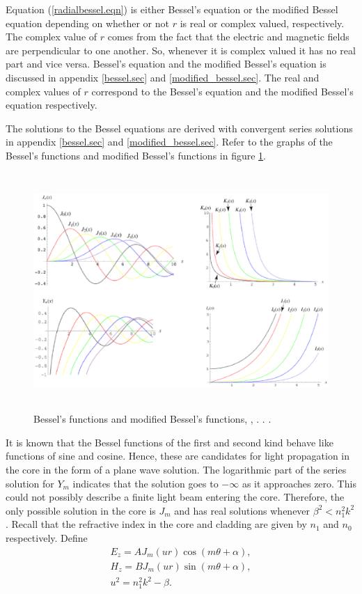 \documentclass[12pt]{article}
\theoremstyle{definition}
\numberwithin{equation}{section}
\begin{document}
{Equation (\ref{radialbessel.eqn}) is either Bessel's equation or the modified Bessel equation depending on whether or not $r$ is real or complex valued, respectively. The complex value of $r$ comes from the fact that the electric and magnetic fields are perpendicular to one another. So, whenever it is complex valued it has no real part and vice versa. Bessel's equation and the modified Bessel's equation is discussed in appendix \ref{bessel.sec} and \ref{modified_bessel.sec}. The real and complex values of $r$ correspond to the Bessel's equation and the modified Bessel's equation respectively.

The solutions to the Bessel equations are derived with convergent series solutions in appendix \ref{bessel.sec} and \ref{modified_bessel.sec}. Refer to the graphs of the Bessel's functions and modified Bessel's functions in figure \ref{figure_bessel}.
\begin{figure}[h!]
\centerline{\includegraphics[height = 90mm, width=160mm, angle=0]{bessel.eps}}
\caption{Bessel's functions and modified Bessel's functions, \cite{wolfJ}, \cite{wolfY}. \cite{wolfK}. \cite{wolfI}.}
\label{figure_bessel}
\end{figure}

It is known that the Bessel functions of the first and second kind behave like functions of sine and cosine. Hence, these are candidates for light propagation in the core in the form of a plane wave solution. The logarithmic part of the series solution for $Y_m$ indicates that the solution goes to $-\infty$ as it approaches zero. This could not possibly describe a finite light beam entering the core.  Therefore, the only possible solution in the core is $J_m$ and has real solutions whenever $\beta^2<n_1^2k^2$. Recall that the refractive index in the core and cladding are given by $n_1$ and $n_0$ respectively. Define
\begin{equation}
\begin{array}{c}
E_z=AJ_m(ur)\cos{(m\theta+\alpha)},\\
H_z=BJ_m(ur)\sin{(m\theta+\alpha)},\\
u^2=n_1^2k^2-\beta.
\end{array}
\end{equation}

}
\end{document}
